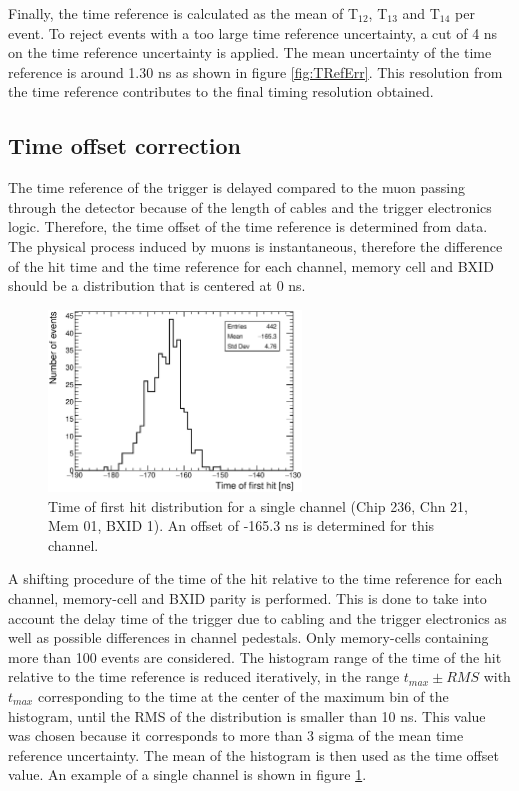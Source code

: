 \documentclass{JINST}
\begin{document}
Finally, the time reference is calculated as the mean of T$_{12}$, T$_{13}$ and T$_{14}$ per event. To reject events with a too large time reference uncertainty, a cut of 4 ns on the time reference uncertainty is applied. The mean uncertainty of the time reference is around 1.30 ns as shown in figure \ref{fig:TRefErr}. This resolution from the time reference contributes to the final timing resolution obtained.

\subsection{Time offset correction}
\label{sec:TimeOffset}

The time reference of the trigger is delayed compared to the muon passing through the detector because of the length of cables and the trigger electronics logic. Therefore, the time offset of the time reference is determined from data. The physical process induced by muons is instantaneous, therefore the difference of the hit time and the time reference for each channel, memory cell and BXID should be a distribution that is centered at 0 ns.

\begin{figure}[htbp!]
  \centering
  \includegraphics[width=0.6\textwidth]{fig/Timing_Chip236_Chn21_Mem01_BXID1_withOffset.eps}
  \caption{Time of first hit distribution for a single channel (Chip 236, Chn 21, Mem 01, BXID 1). An offset of -165.3 ns is determined for this channel.}\label{fig:TimeChnwithOffset}
\end{figure}

A shifting procedure of the time of the hit relative to the time reference for each channel, memory-cell and BXID parity is performed. This is done to take into account the delay time of the trigger due to cabling and the trigger electronics as well as possible differences in channel pedestals. Only memory-cells containing more than 100 events are considered. The histogram range of the time of the hit relative to the time reference is reduced iteratively, in the range $t_{max} \pm RMS$ with $t_{max}$ corresponding to the time at the center of the maximum bin of the histogram, until the RMS of the distribution is smaller than 10 ns. This value was chosen because it corresponds to more than 3 sigma of the mean time reference uncertainty. The mean of the histogram is then used as the time offset value. An example of a single channel is shown in figure \ref{fig:TimeChnwithOffset}.
\end{document}
